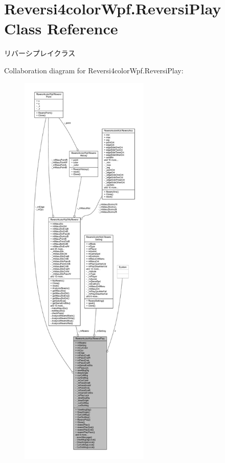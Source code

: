 \hypertarget{class_reversi4color_wpf_1_1_reversi_play}{}\section{Reversi4color\+Wpf.\+Reversi\+Play Class Reference}
\label{class_reversi4color_wpf_1_1_reversi_play}


リバーシプレイクラス  




Collaboration diagram for Reversi4color\+Wpf.\+Reversi\+Play\+:\nopagebreak
\begin{figure}[H]
\begin{center}
\leavevmode
\includegraphics[height=550pt]{class_reversi4color_wpf_1_1_reversi_play__coll__graph}
\end{center}
\end{figure}
